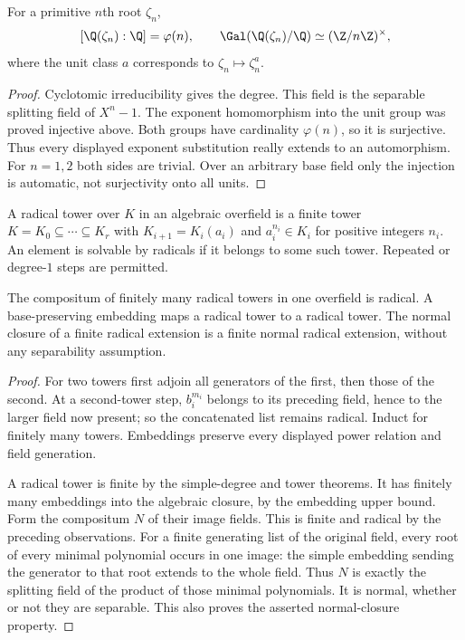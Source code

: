 \begin{theorem}
For a primitive $n$th root $\zeta_n$,
\[[\Q(\zeta_n):\Q]=\varphi(n),\qquad
\Gal(\Q(\zeta_n)/\Q)\simeq(\Z/n\Z)^\times,
\]
where the unit class $a$ corresponds to $\zeta_n\mapsto\zeta_n^a$.
\end{theorem}
\begin{proof}
Cyclotomic irreducibility gives the degree. This field is the separable splitting field of $X^n-1$. The exponent homomorphism into the unit group was proved injective above. Both groups have cardinality $\varphi(n)$, so it is surjective. Thus every displayed exponent substitution really extends to an automorphism. For $n=1,2$ both sides are trivial. Over an arbitrary base field only the injection is automatic, not surjectivity onto all units.
\end{proof}

\begin{definition}
A radical tower over $K$ in an algebraic overfield is a finite tower $K=K_0\subseteq\cdots\subseteq K_r$ with $K_{i+1}=K_i(a_i)$ and $a_i^{n_i}\in K_i$ for positive integers $n_i$. An element is solvable by radicals if it belongs to some such tower. Repeated or degree-$1$ steps are permitted.
\end{definition}
\begin{lemma}\label{lem:radical-composita}
The compositum of finitely many radical towers in one overfield is radical. A base-preserving embedding maps a radical tower to a radical tower. The normal closure of a finite radical extension is a finite normal radical extension, without any separability assumption.
\end{lemma}
\begin{proof}
For two towers first adjoin all generators of the first, then those of the second. At a second-tower step, $b_i^{m_i}$ belongs to its preceding field, hence to the larger field now present; so the concatenated list remains radical. Induct for finitely many towers. Embeddings preserve every displayed power relation and field generation.

A radical tower is finite by the simple-degree and tower theorems. It has finitely many embeddings into the algebraic closure, by the embedding upper bound. Form the compositum $N$ of their image fields. This is finite and radical by the preceding observations. For a finite generating list of the original field, every root of every minimal polynomial occurs in one image: the simple embedding sending the generator to that root extends to the whole field. Thus $N$ is exactly the splitting field of the product of those minimal polynomials. It is normal, whether or not they are separable. This also proves the asserted normal-closure property.
\end{proof}

